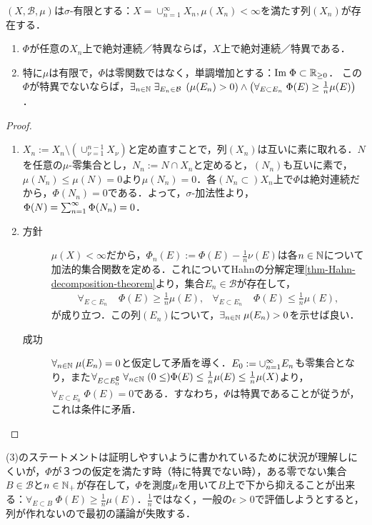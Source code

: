\documentclass[uplatex, dvipdfmx]{jsreport}
\renewcommand{\B}{\mathcal{B}}
\begin{document}
\begin{lemma}\label{lemma-sigma-finite}
    $(X,\B,\mu)$は$\sigma$-有限とする：$X=\cup^\infty_{n=1}X_n,\mu(X_n)<\infty$を満たす列$(X_n)$が存在する．
    \begin{enumerate}
        \item $\Phi$が任意の$X_n$上で絶対連続／特異ならば，$X$上で絶対連続／特異である．
        \item 特に$\mu$は有限で，$\Phi$は零関数ではなく，単調増加とする：$\mathrm{Im}\;\Phi\subset\mathbb{R}_{\ge 0}$．
        この$\Phi$が特異でないならば，$\exists_{n\in\N}\;\exists_{E_n\in\B}\;\paren{\mu(E_n)>0}\land\paren{\forall_{E\subset E_n}\;\Phi(E)\ge\frac{1}{n}\mu(E)}$．
    \end{enumerate}
\end{lemma}
\begin{proof}\mbox{}
    \begin{enumerate}
        \item $X_n:=X_n\setminus(\cup_{\nu=1}^{n-1}X_\nu)$と定め直すことで，列$(X_n)$は互いに素に取れる．$N$を任意の$\mu$-零集合とし，$N_n:=N\cap X_n$と定めると，$(N_n)$も互いに素で，$\mu(N_n)\le\mu(N)=0$より$\mu(N_n)=0$．各$(N_n\subset )X_n$上で$\Phi$は絶対連続だから，$\Phi(N_n)=0$である．よって，$\sigma$-加法性より，$\Phi(N)=\sum_{n=1}^\infty\Phi(N_n)=0$．
        \item \begin{description}
            \item[方針] 
        $\mu(X)<\infty$だから，$\Phi_n(E):=\Phi(E)-\frac{1}{n}\nu(E)$は各$n\in\mathbb{N}$について加法的集合関数を定める．これについてHahnの分解定理\ref{thm-Hahn-decomposition-theorem}より，集合$E_n\in\B$が存在して，
        \begin{align*}
            \forall_{E\subset E_n}\;&\Phi(E)\ge\frac{1}{n}\mu(E),&\forall_{E\subset E_n^\comp}\;&\Phi(E)\le\frac{1}{n}\mu(E),
        \end{align*}
        が成り立つ．この列$(E_n)$について，$\exists_{n\in\mathbb{N}}\;\mu(E_n)>0$を示せば良い．
            \item[成功]
        $\forall_{n\in\mathbb{N}}\;\mu(E_n)=0$と仮定して矛盾を導く．$E_0:=\cup_{n=1}^\infty E_n$も零集合となり，また$\forall_{E\subset E_0^\complement}\;\forall_{n\in\mathbb{N}}\;(0\le)\Phi(E)\le\frac{1}{n}\mu(E)\le\frac{1}{n}\mu(X)$より，$\forall_{E\subset E_0^\comp}\;\Phi(E)=0$である．すなわち，$\Phi$は特異であることが従うが，これは条件に矛盾．
        \end{description}
    \end{enumerate}
\end{proof}
\begin{remarks}
    (3)のステートメントは証明しやすいように書かれているために状況が理解しにくいが，$\Phi$が３つの仮定を満たす時（特に特異でない時），ある零でない集合$B\in\B$と$n\in\mathbb{N}_+$が存在して，$\Phi$を測度$\mu$を用いて$B$上で下から抑えることが出来る：$\forall_{E\subset B}\;\Phi(E)\ge\frac{1}{n}\mu(E)$．$\frac{1}{n}$ではなく，一般の$\epsilon>0$で評価しようとすると，列が作れないので最初の議論が失敗する．
\end{remarks}
\end{document}
